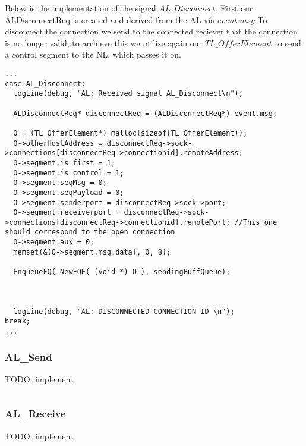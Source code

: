 Below is the implementation of the signal $AL\_Disconnect$.
First our ALDisconnectReq is created and derived from the AL via $event.msg$
To disconnect the connection we send to the connected reciever that the connection is no longer valid, to archieve this
we utilize again our $TL\_OfferElement$ to send a control segment to the NL, which passes it on.
\begin{lstlisting}
...
case AL_Disconnect:
  logLine(debug, "AL: Received signal AL_Disconnect\n");

  ALDisconnectReq* disconnectReq = (ALDisconnectReq*) event.msg;

  O = (TL_OfferElement*) malloc(sizeof(TL_OfferElement));
  O->otherHostAddress = disconnectReq->sock->connections[disconnectReq->connectionid].remoteAddress;
  O->segment.is_first = 1;
  O->segment.is_control = 1;
  O->segment.seqMsg = 0;
  O->segment.seqPayload = 0;
  O->segment.senderport = disconnectReq->sock->port;
  O->segment.receiverport = disconnectReq->sock->connections[disconnectReq->connectionid].remotePort; //This one should correspond to the open connection
  O->segment.aux = 0;
  memset(&(O->segment.msg.data), 0, 8);

  EnqueueFQ( NewFQE( (void *) O ), sendingBuffQueue);



  logLine(debug, "AL: DISCONNECTED CONNECTION ID \n");
break;
...
\end{lstlisting}

\subsubsection{AL\_Send}
TODO: implement
\begin{lstlisting}
\end{lstlisting}

\subsubsection{AL\_Receive}
TODO: implement
\begin{lstlisting}
\end{lstlisting}








\hfill \break
